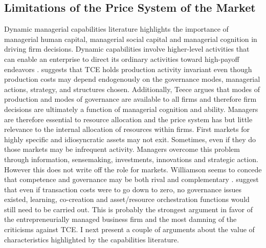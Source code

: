 \documentclass[12pt,letterpaper]{article}
\begin{document}
\subsection{Limitations of the Price System of the Market}
Dynamic managerial capabilities \citep{Adner2003} literature highlights the importance of managerial human capital, managerial social capital and managerial cognition in driving firm decisions. Dynamic capabilities involve higher-level activities that can enable an enterprise to direct its ordinary activities toward high-payoff endeavors \citep{Teece2014a}. \cite{Teece2014b} suggests that TCE holds production activity invariant even though production costs may depend endogenously on the governance modes, managerial actions, strategy, and structures chosen. Additionally, Teece argues that modes of production and modes of governance are available to all firms and therefore firm decisions are ultimately a function of managerial cognition and ability. Managers are therefore essential to resource allocation and the price system has but little relevance to the internal allocation of resources within firms. First markets for highly specific and idiosyncratic assets may not exit. Sometimes, even if they do those markets may be infrequent activity. Managers overcome this problem through information, sensemaking, investments, innovations and strategic action. However this does not write off the role for markets. Williamson seems to concede that competence and governance may be both rival and complementary \citep{Williamson1999}.  \cite{Pitelis2009} suggest that even if transaction costs were to go down to zero, no governance issues existed, learning, co-creation and asset/resource orchestration functions would still need to be carried out. This is probably the strongest argument in favor of the  entrepreneurially managed business firm and the most damning of the criticisms against TCE. I next present a couple of arguments about the value of characteristics highlighted by the capabilities literature.
\end{document}
